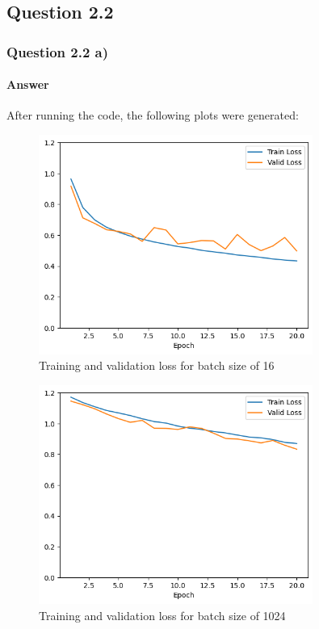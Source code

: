 \documentclass{article}
\begin{document}
\subsection{Question 2.2}

\subsubsection{Question 2.2 a)}
\paragraph{Answer} After running the code, the following plots were generated:
\begin{figure}[H]
    \centering
    \includegraphics[width=0.8\textwidth]{"plots/mlp-training-loss-batch-16-lr-0.1-epochs-20-hidden-200-dropout-0.0-l2-0-layers-2-act-relu-opt-sgd.png"}
    \caption{Training and validation loss for batch size of 16}
    \label{2.2a batch size 16}
\end{figure}

\begin{figure}[H]
    \centering
    \includegraphics[width=0.8\textwidth]{"plots/mlp-training-loss-batch-1024-lr-0.1-epochs-20-hidden-200-dropout-0.0-l2-0-layers-2-act-relu-opt-sgd.png"}
    \caption{Training and validation loss for batch size of 1024}
    \label{2.2a batch size 1024}
\end{figure}
\end{document}
